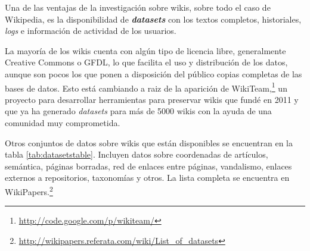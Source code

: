 \documentclass[11pt,onecolumn]{article}
\begin{document}

Una de las ventajas de la investigación sobre wikis, sobre todo el caso de Wikipedia, es la disponibilidad de \textbf{\emph{datasets}} con los textos completos, historiales, \emph{logs} e información de actividad de los usuarios.

La mayoría de los wikis cuenta con algún tipo de licencia libre, generalmente Creative Commons o GFDL, lo que facilita el uso y distribución de los datos, aunque son pocos los que ponen a disposición del público copias completas de las bases de datos. Esto está cambiando a raiz de la aparición de WikiTeam,\footnote{\href{http://code.google.com/p/wikiteam/}{http://code.google.com/p/wikiteam/}} un proyecto para desarrollar herramientas para preservar wikis que fundé en 2011 y que ya ha generado \emph{datasets} para más de 5000 wikis con la ayuda de una comunidad muy comprometida.

Otros conjuntos de datos sobre wikis que están disponibles se encuentran en la tabla \ref{tab:datasetstable}. Incluyen datos sobre coordenadas de artículos, semántica, páginas borradas, red de enlaces entre páginas, vandalismo, enlaces externos a repositorios, taxonomías y otros. La lista completa se encuentra en WikiPapers.\footnote{\href{http://wikipapers.referata.com/wiki/List_of_datasets}{http://wikipapers.referata.com/wiki/List\_of\_datasets}}
\end{document}

